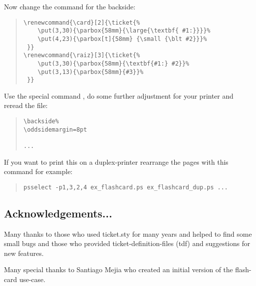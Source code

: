 \documentclass[a4paper,KOMA,landscape]{powersem}
\newcommand{\ticket}{{\code{ticket.sty}}}
\newcommand{\bs}{{\mtt\\}}
\begin{document}
\begin{slide}\vspace*{10mm}
Now change the command for the backside:
\begin{quote}
    \begin{minipage}[t]{0.5\textwidth}
      {\scriptsize
\begin{verbatim}
\renewcommand{\card}[2]{\ticket{%
    \put(3,30){\parbox{58mm}{\large{\textbf{ #1:}}}}%
    \put(4,23){\parbox[t]{58mm} {\small {\blt #2}}}%
 }}
\renewcommand{\raiz}[3]{\ticket{%
    \put(3,30){\parbox{58mm}{\textbf{#1:} #2}}%
    \put(3,13){\parbox{58mm}{#3}}%
 }}
\end{verbatim}
        }
    \end{minipage}
\end{quote}

Use the special command \code{\bs{}backside}, do some further adjustment for your printer and reread the file:
\begin{quote}
    \begin{minipage}[t]{0.5\textwidth}
      {\scriptsize
\begin{verbatim}
\backside%
\oddsidemargin=8pt

...
\end{verbatim}
        }
    \end{minipage}
\end{quote}

If you want to print this on a duplex-printer rearrange the pages with this command for example:
\begin{quote}
    \begin{minipage}[t]{0.5\textwidth}
      {\scriptsize
\begin{verbatim}
psselect -p1,3,2,4 ex_flashcard.ps ex_flashcard_dup.ps ...
\end{verbatim}
        }
    \end{minipage}
\end{quote}
\end{slide}
\begin{slide}
  \section{Acknowledgements...}
  Many thanks to those who used ticket.sty for many years and helped
  to find some small bugs and those who provided ticket-definition-files (tdf)
  and suggestions for new features.
  
  Many special thanks to Santiago Mejia who created an initial version
  of the flash-card use-case.
\end{slide}
\end{document}
